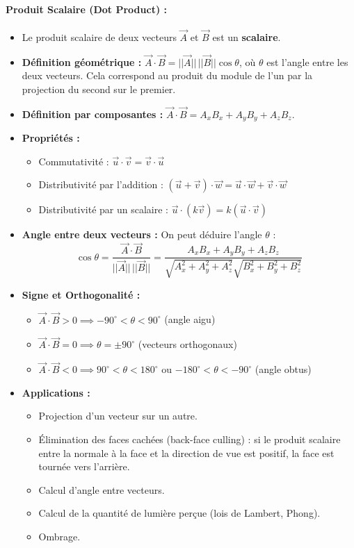 \documentclass{article}
\begin{document}
\paragraph{Produit Scalaire (Dot Product) :}
\begin{itemize}
    \item Le produit scalaire de deux vecteurs $\vec{A}$ et $\vec{B}$ est un \textbf{scalaire}.
    \item \textbf{Définition géométrique :} $\vec{A} \cdot \vec{B} = ||\vec{A}|| \, ||\vec{B}|| \cos \theta$, où $\theta$ est l'angle entre les deux vecteurs. Cela correspond au produit du module de l'un par la projection du second sur le premier.
    \item \textbf{Définition par composantes :} $\vec{A} \cdot \vec{B} = A_x B_x + A_y B_y + A_z B_z$.
    \item \textbf{Propriétés :}
    \begin{itemize}
        \item Commutativité : $\vec{u} \cdot \vec{v} = \vec{v} \cdot \vec{u}$
        \item Distributivité par l'addition : $(\vec{u} + \vec{v}) \cdot \vec{w} = \vec{u} \cdot \vec{w} + \vec{v} \cdot \vec{w}$
        \item Distributivité par un scalaire : $\vec{u} \cdot (k \vec{v}) = k (\vec{u} \cdot \vec{v})$
    \end{itemize}
    \item \textbf{Angle entre deux vecteurs :} On peut déduire l'angle $\theta$ :
    \[ \cos \theta = \frac{\vec{A} \cdot \vec{B}}{||\vec{A}|| \, ||\vec{B}||} = \frac{A_x B_x + A_y B_y + A_z B_z}{\sqrt{A_x^2+A_y^2+A_z^2} \sqrt{B_x^2+B_y^2+B_z^2}} \]
    \item \textbf{Signe et Orthogonalité :}
    \begin{itemize}
        \item $\vec{A} \cdot \vec{B} > 0 \implies -90^\circ < \theta < 90^\circ$ (angle aigu)
        \item $\vec{A} \cdot \vec{B} = 0 \implies \theta = \pm 90^\circ$ (vecteurs orthogonaux)
        \item $\vec{A} \cdot \vec{B} < 0 \implies 90^\circ < \theta < 180^\circ$ ou $-180^\circ < \theta < -90^\circ$ (angle obtus)
    \end{itemize}
    \item \textbf{Applications :}
    \begin{itemize}
        \item Projection d'un vecteur sur un autre.
        \item Élimination des faces cachées (back-face culling) : si le produit scalaire entre la normale à la face et la direction de vue est positif, la face est tournée vers l'arrière.
        \item Calcul d'angle entre vecteurs.
        \item Calcul de la quantité de lumière perçue (lois de Lambert, Phong).
        \item Ombrage.
    \end{itemize}
\end{itemize}
\end{document}
